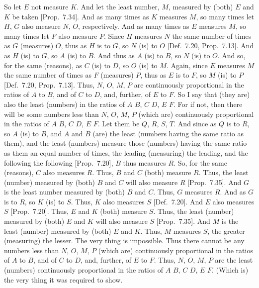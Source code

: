 \begin{Parallel}{}{}
{\epsfysize=2.5in
\centerline{}

So let $E$ not measure $K$. And let the least number, $M$, measured by 
(both) $E$ and $K$ be taken [Prop.~7.34]. And as
many times as $K$ measures $M$, so many times let  $H$, $G$
also measure  $N$, $O$, respectively.  And as many times as $E$ measures $M$,
so many times let $F$ also measure $P$. Since $H$ measures $N$ the same
number of times as $G$
(measures) $O$, thus as $H$ is to $G$, so
$N$ (is) to $O$ [Def.~7.20, Prop.~7.13]. And as $H$ (is) to $G$, so $A$ (is)
to $B$. And thus as $A$ (is) to $B$, so $N$ (is) to $O$. And so, for the
same (reasons),  as $C$ (is) to $D$, so $O$ (is) to $M$. Again, since
$E$ measures $M$ the same number of times as $F$ (measures) $P$,
thus as $E$ is to $F$, so $M$ (is) to $P$ [Def.~7.20, Prop.~7.13]. Thus, $N$, $O$, $M$, $P$ are continuously proportional in the ratios of $A$ to $B$, and of $C$ to $D$, and,
further, of $E$ to $F$. So I say that (they are) also the least (numbers)
in the ratios of $A$ $B$, $C$ $D$, $E$ $F$.
For if not, then there will be some numbers less than $N$, $O$, $M$, $P$
(which are) continuously proportional in the ratios of $A$ $B$, $C$ $D$,
$E$ $F$. Let them be $Q$, $R$, $S$, $T$.
And since as $Q$ is to $R$, so $A$ (is) to $B$, and $A$ and $B$ (are) the
least (numbers having the same ratio as them), and the least (numbers) measure those
(numbers) having the same ratio as them an equal number of times, the leading (measuring) the leading, and the following the following [Prop.~7.20], $B$ thus measures $R$. So, for the
same (reasons), $C$ also measures $R$.  Thus, $B$ and $C$ (both)
measure $R$. Thus, the least (number) measured by (both) $B$ and $C$ will
also measure $R$ [Prop.~7.35]. And $G$ is the
least number measured by (both) $B$ and $C$. Thus, $G$ measures $R$.
And as $G$ is to $R$, so $K$ (is) to $S$. Thus, $K$ also measures $S$
[Def.~7.20]. And $E$ also measures $S$ [Prop.~7.20]. Thus, $E$ and $K$ (both) measure
$S$. Thus, the least (number) measured by (both) $E$ and $K$ will also
measure $S$   [Prop.~7.35]. And $M$  is the least (number) measured by (both)
$E$ and $K$. Thus, $M$ measures $S$, the greater (measuring) the lesser. The very thing is impossible.
Thus there cannot be any numbers less than $N$, $O$, $M$, $P$ (which
are) continuously proportional in the ratios of $A$ to $B$, and of
$C$ to $D$, and, further, of $E$ to $F$. Thus, $N$, $O$, $M$, $P$
are the least (numbers) continuously proportional in the ratios
of $A$ $B$, $C$ $D$, $E$ $F$. (Which is) the very thing it
was required to show.}
\end{Parallel}


